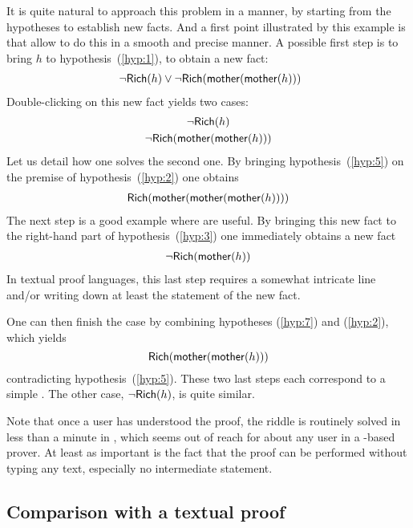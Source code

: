It is quite natural to approach this problem in a  manner, by
starting from the hypotheses to establish new facts. And a first point
illustrated by this example is that   allow to do this in a
smooth and precise manner. A possible first step is to bring $h$ to
hypothesis~(\ref{hyp:1}), to obtain a new fact:
\begin{gather}
  ~\neg\mbox{\textsf{Rich}}(h)\lor \neg\mbox{\textsf{Rich}}(\mbox{\textsf{mother}}(\mbox{\textsf{mother}}(h))) \label{hyp:3}
\end{gather}
Double-clicking on this new fact yields two cases:
\begin{gather}
  \neg\mbox{\textsf{Rich}}(h) \label{hyp:4} \\
  \neg\mbox{\textsf{Rich}}(\mbox{\textsf{mother}}(\mbox{\textsf{mother}}(h))) \label{hyp:5}
\end{gather}
Let us detail how one solves the second one. By bringing
hypothesis~(\ref{hyp:5}) on the premise of hypothesis~(\ref{hyp:2}) one obtains
\begin{gather}
  \mbox{\textsf{Rich}}(\mbox{\textsf{mother}}(\mbox{\textsf{mother}}(\mbox{\textsf{mother}}(h)))) \label{hyp:6}
\end{gather}
The next step is a good example where   are useful. By bringing
this new fact to the right-hand part of hypothesis~(\ref{hyp:3}) one immediately
obtains a new fact
\begin{gather}
  \neg{\mbox{\textsf{Rich}}(\mbox{\textsf{mother}}(h))} \label{hyp:7}
\end{gather}
In textual proof languages, this last step requires a somewhat intricate
 line and/or writing down at least the statement of the new fact.

One can then finish the case by combining hypotheses (\ref{hyp:7}) and
(\ref{hyp:2}), which yields
$$\mbox{\textsf{Rich}}(\mbox{\textsf{mother}}(\mbox{\textsf{mother}}(h)))$$
contradicting hypothesis~(\ref{hyp:5}). These two last steps each correspond to a
simple . The other case, $\neg\mbox{\textsf{Rich}}(h)$, is quite similar.

Note that once a user has understood the proof, the riddle is routinely solved
in less than a minute in , which seems out of reach for about any user in
a -based prover. At least as important is the fact that the proof can be
performed without typing any text, especially no intermediate statement. 

\subsection{Comparison with a textual proof}

